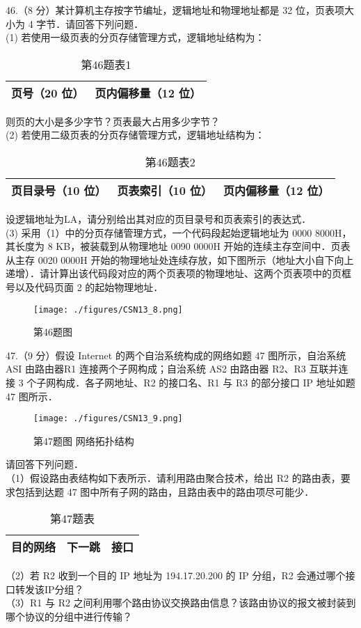 46.（8 分）某计算机主存按字节编址，逻辑地址和物理地址都是 32 位，页表项大小为 4 字节．请回答下列问题．\\
(1) 若使用一级页表的分页存储管理方式，逻辑地址结构为： \\
\begin{table}[ht]
\centering
\caption{第46题表1}\label{CSN13_tab4}
\begin{tabular}{|c|c|}
\hline
页号（20 位） & 页内偏移量（12 位） \\
\hline
\end{tabular}
\end{table}
则页的大小是多少字节？页表最大占用多少字节？  \\
(2) 若使用二级页表的分页存储管理方式，逻辑地址结构为： \\
\begin{table}[ht]
\centering
\caption{第46题表2}\label{CSN13_tab5}
\begin{tabular}{|c|c|c|}
\hline
页目录号（10 位） & 页表索引（10 位） & 页内偏移量（12 位） \\
\hline
\end{tabular}
\end{table}
设逻辑地址为LA，请分别给出其对应的页目录号和页表索引的表达式． \\
(3) 采用（1）中的分页存储管理方式，一个代码段起始逻辑地址为 0000 8000H，其长度为 8 KB，被装载到从物理地址 0090 0000H 开始的连续主存空间中．页表从主存 0020 0000H 开始的物理地址处连续存放，如下图所示（地址大小自下向上递增）．请计算出该代码段对应的两个页表项的物理地址、这两个页表项中的页框号以及代码页面 2 的起始物理地址． \\
\begin{figure}[ht]
\centering
\texttt{[image: ./figures/CSN13\_8.png]}
\caption{第46题图} \label{CSN13_fig8}
\end{figure}

47.（9 分）假设 Internet 的两个自治系统构成的网络如题 47 图所示，自治系统 ASI 由路由器R1 连接两个子网构成；自治系统 AS2 由路由器 R2、R3 互联并连接 3 个子网构成．各子网地址、R2 的接口名、R1 与 R3 的部分接口 IP 地址如题 47 图所示．
\begin{figure}[ht]
\centering
\texttt{[image: ./figures/CSN13\_9.png]}
\caption{第47题图 网络拓扑结构} \label{CSN13_fig9}
\end{figure}
请回答下列问题． \\
（1）假设路由表结构如下表所示．请利用路由聚合技术，给出 R2 的路由表，要求包括到达题 47 图中所有子网的路由，且路由表中的路由项尽可能少． 
\begin{table}[ht]
\centering
\caption{第47题表}\label{CSN13_tab6}
\begin{tabular}{|c|c|c|}
\hline
目的网络 & 下一跳 & 接口 \\
\hline
\end{tabular}
\end{table}
（2）若 R2 收到一个目的 IP 地址为 194.17.20.200 的 IP 分组，R2 会通过哪个接口转发该IP分组？  \\
（3）R1 与 R2 之间利用哪个路由协议交换路由信息？该路由协议的报文被封装到哪个协议的分组中进行传输？


